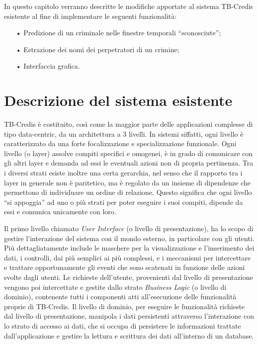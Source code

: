 

In questo capitolo verranno descritte le modifiche apportate al sistema TB-Credis esistente al fine di implementare le seguenti funzionalità:
\begin{itemize}
	\item[•] Predizione di un criminale nelle finestre temporali ``sconosciute'';
	\item[•] Estrazione dei nomi dei perpetratori di un crimine;
	\item[•] Interfaccia grafica.
\end{itemize}

\section{Descrizione del sistema esistente}
TB-Credis è costituito, così come la maggior parte delle applicazioni complesse di tipo
data-centric, da un architettura a 3 livelli.
In sistemi siffatti, ogni livello è caratterizzato da una forte focalizzazione e specializzazione
funzionale. Ogni livello (o layer) assolve compiti specifici e omogenei, è in grado di
comunicare con gli altri layer e demanda ad essi le eventuali azioni non di propria
pertinenza. Tra i diversi strati esiste inoltre una certa gerarchia, nel senso che il rapporto tra
i layer in generale non è paritetico, ma è regolato da un insieme di dipendenze che
permettono di individuare un ordine di relazione. Questo significa che ogni livello ``si
appoggia'' ad uno o più strati per poter eseguire i suoi compiti, dipende da essi e comunica
unicamente con loro.

Il primo livello chiamato \textit{User Interface} (o livello di presentazione), ha lo scopo di gestire l'interazione del sistema con il mondo esterno, in particolare con gli utenti. Più dettagliatamente include le maschere per la visualizzazione e l'inserimento dei dati, i controlli, dai più semplici ai più complessi, e i meccanismi per intercettare e trattare opportunamente gli eventi che sono scatenati in funzione delle azioni svolte dagli utenti.
Le richieste dell'utente, provenienti dal livello di presentazione vengono poi intercettate e gestite dallo strato \textit{Business Logic} (o livello di dominio), contenente tutti i componenti atti all'esecuzione delle funzionalità proprie di TB-Credis. Il livello di dominio, per eseguire le funzionalità richieste dal livello di presentazione, manipola i dati persistenti attraverso l'interazione con lo strato di accesso ai dati, che si occupa di persistere le informazioni trattate dall'applicazione e gestire la lettura e scrittura dei dati all'interno di un database.

